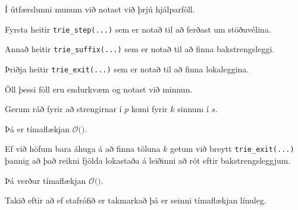 {
	{
		\item<1-> Í útfærslunni munum við notast við þrjú hjálparföll.
		\item<2-> Fyrsta heitir \texttt{trie\_step(...)} sem er notað til að ferðast um stöðuvélina.
		\item<3-> Annað heitir \texttt{trie\_suffix(...)} sem er notað til að finna bakstrengsleggi.
		\item<4-> Þriðja heitir \texttt{trie\_exit(...)} sem er notað til að finna lokaleggina.
		\item<5-> Öll þessi föll eru endurkvæm og notast við minnun.
	}
}

{
}

{
}

{
}

{
	{
		\item<1-> Gerum ráð fyrir að strengirnar í $p$ komi fyrir $k$ sinnum í $s$.
		\item<2-> Þá er tímaflækjan $\mathcal{O}($\onslide<3->{$|s| + |\Sigma| \cdot |p| + k$}$)$.
		\item<4-> Ef við höfum bara áhuga á að finna töluna $k$ getum við breytt \texttt{trie\_exit(...)}
					þannig að það reikni fjölda lokastaða á leiðinni að rót eftir bakstrengsleggjum.
		\item<5-> Þá verður tímaflækjan $\mathcal{O}($\onslide<6->{$|s| + |\Sigma| \cdot |p|$}$)$.
		\item<7-> Takið eftir að ef stafrófið er takmarkað þá er seinni tímaflækjan línuleg.
	}
}

{
}


